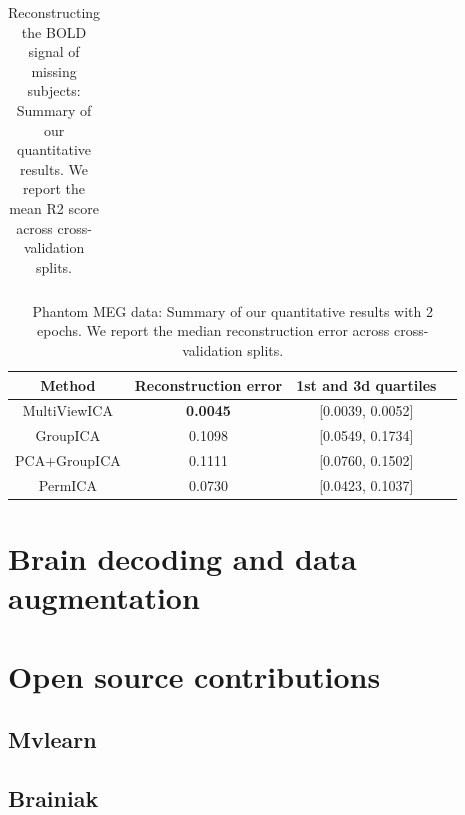\documentclass[12pt]{report}
\begin{document}
\begin{table}
\begin{tabular}{|c|c | c | c|}
         
    \end{tabular}
    \caption{Reconstructing the BOLD signal of missing subjects: Summary of our quantitative results. We report the mean R2 score across cross-validation splits.}
    \label{tab:recon}
\end{table}

\begin{table}
    \centering
    \begin{tabular}{|c|c|c|c}
    \hline
         \textbf{Method} & \textbf{Reconstruction error} & \textbf{1st and 3d quartiles} 
         \\
         \hline
         MultiViewICA & \textbf{0.0045} & [0.0039, 0.0052] \\ 
GroupICA & 0.1098 & [0.0549, 0.1734] \\ 
PCA+GroupICA & 0.1111 & [0.0760, 0.1502] \\ 
PermICA & 0.0730 & [0.0423, 0.1037] \\ 
\hline
    \end{tabular}
    \caption{Phantom MEG data: Summary of our quantitative results with 2 epochs. We report the median reconstruction error across cross-validation splits.}
    \label{tab:meg}
\end{table}
\chapter{Brain decoding and data augmentation}
\chapter{Open source contributions}
\section{Mvlearn}
\section{Brainiak}
\end{document}
